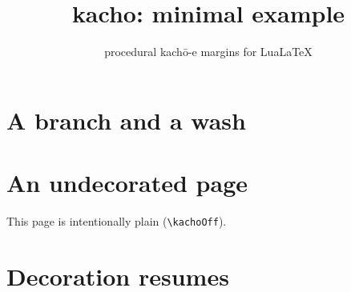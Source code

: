 \documentclass[11pt,twoside]{article}
\title{kacho: minimal example}
\author{procedural kach\=o-e margins for Lua\LaTeX}
\date{}
\begin{document}
\maketitle
\section*{A branch and a wash}
\lipsum[1-3]

\lipsum[4-6]
\clearpage
\kachoOff
\section*{An undecorated page}
This page is intentionally plain (\verb|\kachoOff|).
\clearpage
\kachoOn
\section*{Decoration resumes}
\lipsum[7-8]
\end{document}
